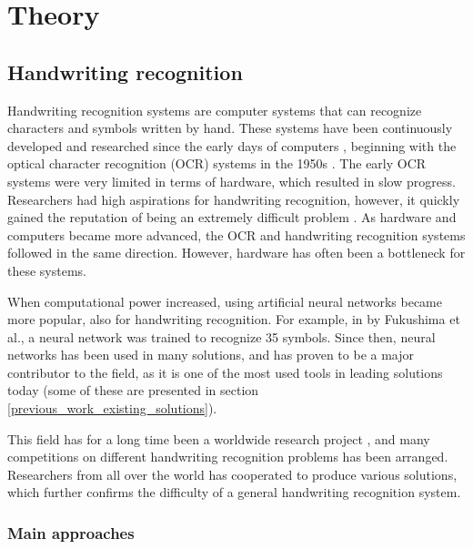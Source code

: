 \chapter{Theory}

\section{Handwriting recognition}
\label{handwriting_recognition}

Handwriting recognition systems are computer systems that can recognize characters and symbols written by hand. These systems have been continuously developed and researched since the early days of computers \parencite{simon_off-line_1992}, beginning with the optical character recognition (OCR) systems in the 1950s \parencite{mori_historical_1992}. The early OCR systems were very limited in terms of hardware, which resulted in slow progress. Researchers had high aspirations for handwriting recognition, however, it quickly gained the reputation of being an extremely difficult problem \parencite{simon_off-line_1992}. As hardware and computers became more advanced, the OCR and handwriting recognition systems followed in the same direction. However, hardware has often been a bottleneck for these systems. \parencite{mori_historical_1992}

When computational power increased, using artificial neural networks became more popular, also for handwriting recognition. For example, in \cite{fukushima_handwritten_????} by Fukushima et al., a neural network was trained to recognize 35 symbols. Since then, neural networks has been used in many solutions, and has proven to be a major contributor to the field, as it is one of the most used tools in leading solutions today (some of these are presented in section \ref{previous_work_existing_solutions}).

This field has for a long time been a worldwide research project \parencite{mori_historical_1992}, and many competitions on different handwriting recognition problems has been arranged. Researchers from all over the world has cooperated to produce various solutions, which further confirms the difficulty of a general handwriting recognition system. 

\subsection{Main approaches}
\label{main_approaches}

